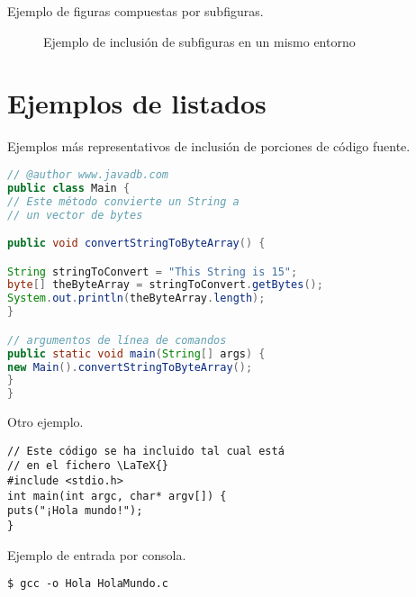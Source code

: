 \noindent Ejemplo de figuras compuestas por subfiguras.

\begin{figure}[htb]
	\centering
	\caption[Ejemplo de subfiguras]{Ejemplo de inclusión de subfiguras en un mismo entorno}
	\label{fig:ejSubfigures}
\end{figure}


\clearpage


\section{Ejemplos de listados}
\label{sec:ejListados}

Ejemplos más representativos de inclusión de porciones de código fuente.

\begin{lstlisting}[language=Java,float=ht,caption={[Código fuente en Java]Ejemplo de código fuente en lenguaje Java},label=lst:java]
// @author www.javadb.com
public class Main {    
// Este método convierte un String a
// un vector de bytes

public void convertStringToByteArray() {

String stringToConvert = "This String is 15";      
byte[] theByteArray = stringToConvert.getBytes();        
System.out.println(theByteArray.length);        
}

// argumentos de línea de comandos 
public static void main(String[] args) {
new Main().convertStringToByteArray();
}
}
\end{lstlisting}



\noindent Otro ejemplo.

\begin{lstlisting}[style=C-ruled,float=ht,caption={Ejemplo de código C},label=lst:codC]
// Este código se ha incluido tal cual está 
// en el fichero \LaTeX{}
#include <stdio.h>
int main(int argc, char* argv[]) {
puts("¡Hola mundo!");
}
\end{lstlisting}


\noindent Ejemplo de entrada por consola.

\begin{lstlisting}[style=consola, numbers=none]
$ gcc -o Hola HolaMundo.c
\end{lstlisting}


